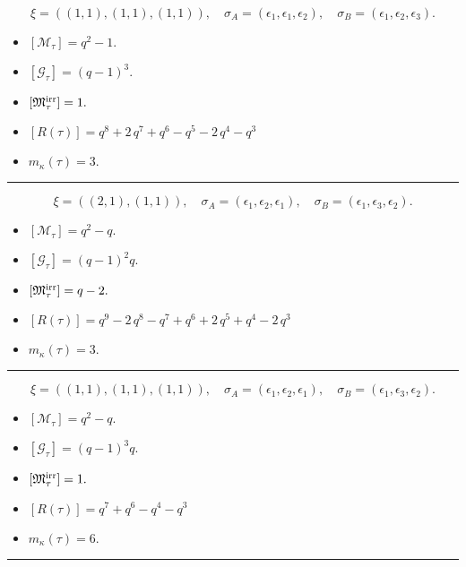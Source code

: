 \documentclass[10pt,a4paper]{amsart}
\begin{document}
$$\xi = ({(1, 1), (1, 1)}, {(1, 1)}),\quad \sigma_A = ({{\epsilon_1}, {\epsilon_1}}, {{\epsilon_2}}),\quad \sigma_B = ({{\epsilon_1}, {\epsilon_2}}, {{\epsilon_3}}).$$

\begin{itemize}
 \item $[\mathcal{M}_{\tau}] = q^{2} - 1 .$

 \item $[\mathcal{G}_{\tau}] = {\left(q - 1\right)}^{3} .$

 \item $[{\frak M}_{\tau}^{\textrm{irr}}] = 1 .$

 \item $[R(\tau)] = q^{8} + 2 \, q^{7} + q^{6} - q^{5} - 2 \, q^{4} - q^{3} $

 \item $m_{\kappa}(\tau) = 3 .$

 \end{itemize}
\noindent\rule{8cm}{0.4pt}

$$\xi = ({(2, 1)}, {(1, 1)}),\quad \sigma_A = ({{\epsilon_1, \epsilon_2}}, {{\epsilon_1}}),\quad \sigma_B = ({{\epsilon_1, \epsilon_3}}, {{\epsilon_2}}).$$

\begin{itemize}
 \item $[\mathcal{M}_{\tau}] = q^{2} - q .$

 \item $[\mathcal{G}_{\tau}] = {\left(q - 1\right)}^{2} q .$

 \item $[{\frak M}_{\tau}^{\textrm{irr}}] = q - 2 .$

 \item $[R(\tau)] = q^{9} - 2 \, q^{8} - q^{7} + q^{6} + 2 \, q^{5} + q^{4} - 2 \, q^{3} $

 \item $m_{\kappa}(\tau) = 3 .$

 \end{itemize}
\noindent\rule{8cm}{0.4pt}

$$\xi = ({(1, 1), (1, 1)}, {(1, 1)}),\quad \sigma_A = ({{\epsilon_1}, {\epsilon_2}}, {{\epsilon_1}}),\quad \sigma_B = ({{\epsilon_1}, {\epsilon_3}}, {{\epsilon_2}}).$$

\begin{itemize}
 \item $[\mathcal{M}_{\tau}] = q^{2} - q .$

 \item $[\mathcal{G}_{\tau}] = {\left(q - 1\right)}^{3} q .$

 \item $[{\frak M}_{\tau}^{\textrm{irr}}] = 1 .$

 \item $[R(\tau)] = q^{7} + q^{6} - q^{4} - q^{3} $

 \item $m_{\kappa}(\tau) = 6 .$

 \end{itemize}
\noindent\rule{8cm}{0.4pt}
\end{document}
